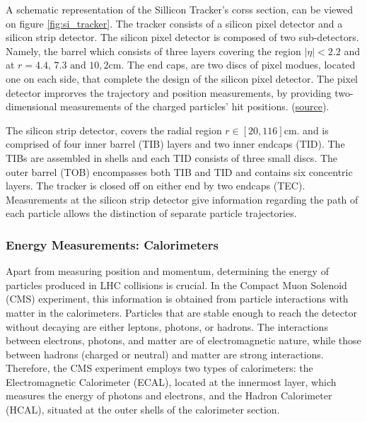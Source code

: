 A schematic representation of the Sillicon Tracker's corss section, can be viewed on figure \ref{fig:si_tracker}. The tracker consists of a silicon pixel detector and a silicon strip detector. The silicon pixel detector is composed of two sub-detectors. Namely, the barrel which consists of three layers covering the region \(|\eta| < 2.2\) and at \(r = 4.4\text{, }7.3\text{ and }10,2\text{cm}\). The end caps, are two discs of pixel modues, located one on each side, that complete the design of the silicon pixel detector. The pixel detector improrves the trajectory and position measurements, by providing two-dimensional measurements of the charged particles' hit positions. (\href{https://cds.cern.ch/record/1129810}{source}).

The silicon strip detector, covers the radial region \(r \in \left[ 20, 116 \right]\text{cm}\). and  is comprised of four inner barrel (TIB) layers and two inner endcaps (TID). The TIBs are assembled in shells and each TID consists of three small discs. The outer barrel (TOB) encompasses both TIB and TID and contains six concentric layers. The tracker is closed off on either end by two endcaps (TEC). Measurements at the silicon strip detector give information regarding the path of each particle allows the distinction of separate particle trajectories.

\subsubsection{Energy Measurements: Calorimeters}
\label{sec:orgeca8eed}
Apart from measuring position and momentum, determining the energy of particles produced in LHC collisions is crucial. In the Compact Muon Solenoid (CMS) experiment, this information is obtained from particle interactions with matter in the calorimeters. Particles that are stable enough to reach the detector without decaying are either leptons, photons, or hadrons. The interactions between electrons, photons, and matter are of electromagnetic nature, while those between hadrons (charged or neutral) and matter are strong interactions. Therefore, the CMS experiment employs two types of calorimeters: the Electromagnetic Calorimeter (ECAL), located at the innermost layer, which measures the energy of photons and electrons, and the Hadron Calorimeter (HCAL), situated at the outer shells of the calorimeter section.

